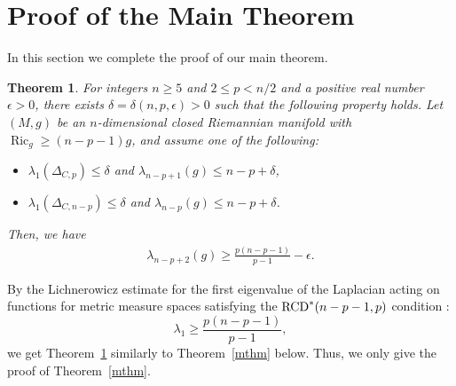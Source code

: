\documentclass[pdftex]{sigma}
\numberwithin{equation}{section}
\newtheorem{Thm}{Theorem}[section]
\theoremstyle{definition}
\newcommand{\Ric}{\operatorname{Ric}}
\newcommand{\RCD}{{\rm RCD}^\ast}
\begin{document}
\section{Proof of the Main Theorem}
In this section we complete the proof of our main theorem.
\begin{Thm}\label{n-p+2}
For integers $n\geq 5$ and $2\leq p < n/2$ and a positive real number $\epsilon>0$, there exists $\delta=\delta(n,p,\epsilon)>0$ such that the following property holds.
Let $(M,g)$ be an $n$-dimensional closed Riemannian manifold with $\Ric_g\geq (n-p-1)g$, and assume one of the following:
\begin{itemize}\itemsep=0pt
\item $\lambda_1(\Delta_{C,p})\leq \delta$ and $\lambda_{n-p+1}(g)\leq n-p+\delta$,
\item $\lambda_1(\Delta_{C,n-p})\leq \delta$ and $\lambda_{n-p}(g)\leq n-p+\delta$.
\end{itemize}
Then, we have
\begin{gather*}
\lambda_{n-p+2}(g)\geq \frac{p(n-p-1)}{p-1}-\epsilon.
\end{gather*}
\end{Thm}
By the Lichnerowicz estimate for the first eigenvalue of the Laplacian acting on functions for metric measure spaces satisfying the $\RCD(n-p-1,p)$ condition \cite[Theorem~4.22]{EKS}:
\[
\lambda_1\geq \frac{p(n-p-1)}{p-1},
\]
we get Theorem~\ref{n-p+2} similarly to Theorem~\ref{mthm} below.
Thus, we only give the proof of Theorem~\ref{mthm}.
\end{document}
